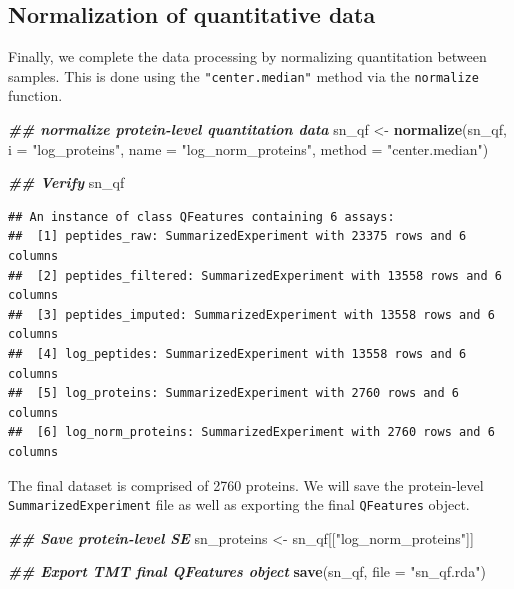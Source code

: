 \documentclass[9pt,a4paper,]{extarticle}
\newenvironment{Shaded}{\begin{snugshade}}{\end{snugshade}}
\newcommand{\AttributeTok}[1]{\textcolor[rgb]{0.13,0.29,0.53}{#1}}
\newcommand{\DocumentationTok}[1]{\textcolor[rgb]{0.56,0.35,0.01}{\textbf{\textit{#1}}}}
\newcommand{\FunctionTok}[1]{\textcolor[rgb]{0.13,0.29,0.53}{\textbf{#1}}}
\newcommand{\NormalTok}[1]{#1}
\newcommand{\OtherTok}[1]{\textcolor[rgb]{0.56,0.35,0.01}{#1}}
\newcommand{\StringTok}[1]{\textcolor[rgb]{0.31,0.60,0.02}{#1}}
\begin{document}
\subsection{Normalization of quantitative data}\label{normalization-of-quantitative-data-1}

Finally, we complete the data processing by normalizing quantitation between
samples. This is done using the \texttt{"center.median"} method via the \texttt{normalize}
function.

\begin{Shaded}
\begin{Highlighting}[]
\DocumentationTok{\#\# normalize protein{-}level quantitation data}
\NormalTok{sn\_qf }\OtherTok{\textless{}{-}} \FunctionTok{normalize}\NormalTok{(sn\_qf,}
                   \AttributeTok{i =} \StringTok{"log\_proteins"}\NormalTok{,}
                   \AttributeTok{name =} \StringTok{"log\_norm\_proteins"}\NormalTok{,}
                   \AttributeTok{method =} \StringTok{"center.median"}\NormalTok{)}

\DocumentationTok{\#\# Verify}
\NormalTok{sn\_qf}
\end{Highlighting}
\end{Shaded}

\begin{verbatim}
## An instance of class QFeatures containing 6 assays:
##  [1] peptides_raw: SummarizedExperiment with 23375 rows and 6 columns 
##  [2] peptides_filtered: SummarizedExperiment with 13558 rows and 6 columns 
##  [3] peptides_imputed: SummarizedExperiment with 13558 rows and 6 columns 
##  [4] log_peptides: SummarizedExperiment with 13558 rows and 6 columns 
##  [5] log_proteins: SummarizedExperiment with 2760 rows and 6 columns 
##  [6] log_norm_proteins: SummarizedExperiment with 2760 rows and 6 columns
\end{verbatim}

The final dataset is comprised of 2760 proteins.
We will save the protein-level \texttt{SummarizedExperiment} file as well as exporting
the final \texttt{QFeatures} object.

\begin{Shaded}
\begin{Highlighting}[]
\DocumentationTok{\#\# Save protein{-}level SE}
\NormalTok{sn\_proteins }\OtherTok{\textless{}{-}}\NormalTok{ sn\_qf[[}\StringTok{"log\_norm\_proteins"}\NormalTok{]]}

\DocumentationTok{\#\# Export TMT final QFeatures object}
\FunctionTok{save}\NormalTok{(sn\_qf, }\AttributeTok{file =} \StringTok{"sn\_qf.rda"}\NormalTok{)}
\end{Highlighting}
\end{Shaded}
\end{document}
